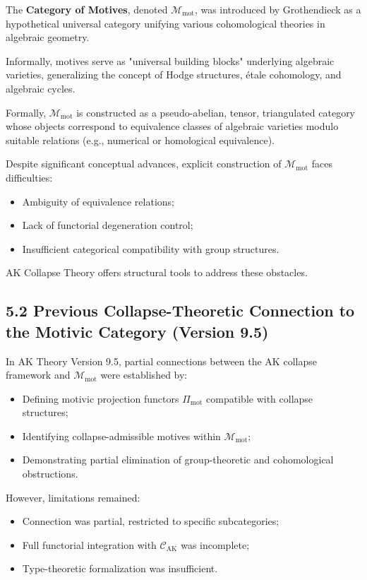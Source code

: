 \documentclass[11pt]{article}
\begin{document}
The \textbf{Category of Motives}, denoted $\mathcal{M}_{\mathrm{mot}}$, was introduced by Grothendieck as a hypothetical universal category unifying various cohomological theories in algebraic geometry.

Informally, motives serve as "universal building blocks" underlying algebraic varieties, generalizing the concept of Hodge structures, étale cohomology, and algebraic cycles.

Formally, $\mathcal{M}_{\mathrm{mot}}$ is constructed as a pseudo-abelian, tensor, triangulated category whose objects correspond to equivalence classes of algebraic varieties modulo suitable relations (e.g., numerical or homological equivalence).

Despite significant conceptual advances, explicit construction of $\mathcal{M}_{\mathrm{mot}}$ faces difficulties:

\begin{itemize}
    \item Ambiguity of equivalence relations;
    \item Lack of functorial degeneration control;
    \item Insufficient categorical compatibility with group structures.
\end{itemize}

AK Collapse Theory offers structural tools to address these obstacles.

\subsection{5.2 Previous Collapse-Theoretic Connection to the Motivic Category (Version 9.5)}

In AK Theory Version 9.5, partial connections between the AK collapse framework and $\mathcal{M}_{\mathrm{mot}}$ were established by:

\begin{itemize}
    \item Defining motivic projection functors $\Pi_{\mathrm{mot}}$ compatible with collapse structures;
    \item Identifying collapse-admissible motives within $\mathcal{M}_{\mathrm{mot}}$;
    \item Demonstrating partial elimination of group-theoretic and cohomological obstructions.
\end{itemize}

However, limitations remained:

\begin{itemize}
    \item Connection was partial, restricted to specific subcategories;
    \item Full functorial integration with $\mathcal{C}_{\mathrm{AK}}$ was incomplete;
    \item Type-theoretic formalization was insufficient.
\end{itemize}
\end{document}
